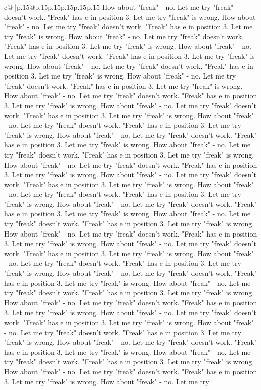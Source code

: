 \documentclass{article}
\begin{document}
{\begin{supertabular}{c@{$\;$}|p{.15\linewidth}@{}p{.15\linewidth}p{.15\linewidth}p{.15\linewidth}p{.15\linewidth}p{.15\linewidth}}
{{{How about "freak" {-} no. Let me try "freak" doesn't work. "Freak" has e in position 3. Let me try "freak" is wrong. How about "freak" {-} no. Let me try "freak" doesn't work. "Freak" has e in position 3. Let me try "freak" is wrong. How about "freak" {-} no. Let me try "freak" doesn't work. "Freak" has e in position 3. Let me try "freak" is wrong. How about "freak" {-} no. Let me try "freak" doesn't work. "Freak" has e in position 3. Let me try "freak" is wrong. How about "freak" {-} no. Let me try "freak" doesn't work. "Freak" has e in position 3. Let me try "freak" is wrong. How about "freak" {-} no. Let me try "freak" doesn't work. "Freak" has e in position 3. Let me try "freak" is wrong. How about "freak" {-} no. Let me try "freak" doesn't work. "Freak" has e in position 3. Let me try "freak" is wrong. How about "freak" {-} no. Let me try "freak" doesn't work. "Freak" has e in position 3. Let me try "freak" is wrong. How about "freak" {-} no. Let me try "freak" doesn't work. "Freak" has e in position 3. Let me try "freak" is wrong. How about "freak" {-} no. Let me try "freak" doesn't work. "Freak" has e in position 3. Let me try "freak" is wrong. How about "freak" {-} no. Let me try "freak" doesn't work. "Freak" has e in position 3. Let me try "freak" is wrong. How about "freak" {-} no. Let me try "freak" doesn't work. "Freak" has e in position 3. Let me try "freak" is wrong. How about "freak" {-} no. Let me try "freak" doesn't work. "Freak" has e in position 3. Let me try "freak" is wrong. How about "freak" {-} no. Let me try "freak" doesn't work. "Freak" has e in position 3. Let me try "freak" is wrong. How about "freak" {-} no. Let me try "freak" doesn't work. "Freak" has e in position 3. Let me try "freak" is wrong. How about "freak" {-} no. Let me try "freak" doesn't work. "Freak" has e in position 3. Let me try "freak" is wrong. How about "freak" {-} no. Let me try "freak" doesn't work. "Freak" has e in position 3. Let me try "freak" is wrong. How about "freak" {-} no. Let me try "freak" doesn't work. "Freak" has e in position 3. Let me try "freak" is wrong. How about "freak" {-} no. Let me try "freak" doesn't work. "Freak" has e in position 3. Let me try "freak" is wrong. How about "freak" {-} no. Let me try "freak" doesn't work. "Freak" has e in position 3. Let me try "freak" is wrong. How about "freak" {-} no. Let me try "freak" doesn't work. "Freak" has e in position 3. Let me try "freak" is wrong. How about "freak" {-} no. Let me try "freak" doesn't work. "Freak" has e in position 3. Let me try "freak" is wrong. How about "freak" {-} no. Let me try "freak" doesn't work. "Freak" has e in position 3. Let me try "freak" is wrong. How about "freak" {-} no. Let me try "freak" doesn't work. "Freak" has e in position 3. Let me try "freak" is wrong. How about "freak" {-} no. Let me try "freak" doesn't work. "Freak" has e in position 3. Let me try "freak" is wrong. How about "freak" {-} no. Let me try "freak" doesn't work. "Freak" has e in position 3. Let me try "freak" is wrong. How about "freak" {-} no. Let me try "freak" doesn't work. "Freak" has e in position 3. Let me try "freak" is wrong. How about "freak" {-} no. Let me try }}}
\end{supertabular}}
\end{document}
